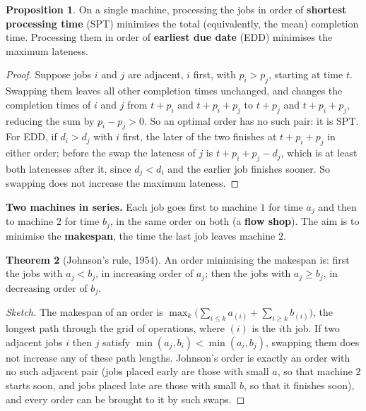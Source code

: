 \documentclass[11pt,a4paper]{article}
\numberwithin{equation}{section}
\theoremstyle{definition}
\newtheorem{thm}{Theorem}[subsection]
\newtheorem{prop}[thm]{Proposition}
\begin{document}
\begin{prop}
\label{prop:spt}
On a single machine, processing the jobs in order of \textbf{shortest processing time} (SPT) minimises the total (equivalently, the mean) completion time. Processing them in order of \textbf{earliest due date} (EDD) minimises the maximum lateness.
\end{prop}

\begin{proof}
Suppose jobs $i$ and $j$ are adjacent, $i$ first, with $p_i > p_j$, starting at time $t$. Swapping them leaves all other completion times unchanged, and changes the completion times of $i$ and $j$ from $t + p_i$ and $t + p_i + p_j$ to $t + p_j$ and $t + p_i + p_j$, reducing the sum by $p_i - p_j > 0$. So an optimal order has no such pair:
it is SPT. For EDD, if $d_i > d_j$ with $i$ first, the later of the two finishes at $t + p_i + p_j$ in either order; before the swap the lateness of $j$ is $t + p_i + p_j - d_j$, which is at least both latenesses after it, since $d_j < d_i$ and the earlier job finishes sooner. So swapping does not increase the maximum lateness.
\end{proof}

\textbf{Two machines in series.} Each job goes first to machine $1$ for time $a_j$ and then to machine $2$ for time $b_j$, in the same order on both (a \textbf{flow shop}). The aim is to minimise the \textbf{makespan}, the time the last job leaves machine $2$.

\begin{thm}[Johnson's rule, 1954]
\label{thm:johnson}
An order minimising the makespan is: first the jobs with $a_j < b_j$, in increasing order of $a_j$; then the jobs with $a_j \geq b_j$, in decreasing order of $b_j$.
\end{thm}

\begin{proof}[Sketch]
The makespan of an order is $\max_k\bigl(\sum_{i \leq k}a_{(i)} + \sum_{i \geq k}b_{(i)}\bigr)$, the longest path through the grid of operations, where $(i)$ is the $i$th job. If two adjacent jobs $i$ then $j$ satisfy $\min(a_j, b_i) < \min(a_i, b_j)$, swapping them does not increase any of these path lengths. Johnson's order is exactly an order with
no such adjacent pair (jobs placed early are those with small $a$, so that machine $2$ starts soon, and jobs placed late are those with small $b$, so that it finishes soon), and every order can be brought to it by such swaps.
\end{proof}
\end{document}
